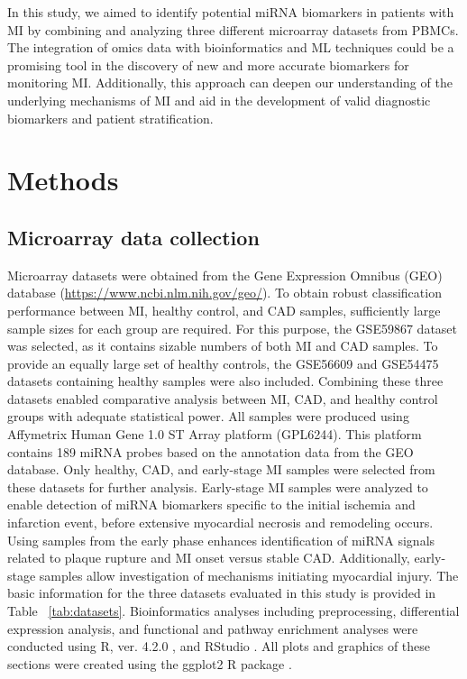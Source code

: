 \documentclass[sn-mathphys,Numbered]{sn-jnl}%
\theoremstyle{thmstyleone}%
\theoremstyle{thmstyletwo}%
\theoremstyle{thmstylethree}%
\begin{document}
In this study, we aimed to identify potential miRNA biomarkers in
patients with MI by combining and analyzing three different microarray
datasets from PBMCs. The integration of omics data with bioinformatics
and ML techniques could be a promising tool in the discovery of new and
more accurate biomarkers for monitoring MI. Additionally, this approach
can deepen our understanding of the underlying mechanisms of MI and aid
in the development of valid diagnostic biomarkers and patient
stratification.
 
\section{Methods}\label{methods}

\subsection{Microarray data
collection}\label{microarray-data-collection}

Microarray datasets were obtained from the Gene Expression Omnibus (GEO)
database (\url{https://www.ncbi.nlm.nih.gov/geo/}).
To obtain robust classification performance between MI, healthy control, and CAD samples, sufficiently large sample sizes for each group are required. For this purpose, the GSE59867 dataset was selected, as it contains sizable numbers of both MI and CAD samples. To provide an equally large set of healthy controls, the GSE56609 and GSE54475 datasets containing healthy samples were also included. Combining these three datasets enabled comparative analysis between MI, CAD, and healthy control groups with adequate statistical power.
All samples were produced using Affymetrix Human Gene 1.0 ST Array
platform (GPL6244). 
This platform contains 189 miRNA probes based on the annotation data from the GEO database.
Only healthy, CAD, and early-stage MI samples were
selected from these datasets for further analysis.
Early-stage MI samples were analyzed to enable detection of miRNA biomarkers specific to the initial ischemia and infarction event, before extensive myocardial necrosis and remodeling occurs. Using samples from the early phase enhances identification of miRNA signals related to plaque rupture and MI onset versus stable CAD. Additionally, early-stage samples allow investigation of mechanisms initiating myocardial injury.
The basic information
for the three datasets evaluated in this study is provided in Table
~\ref{tab:datasets}. Bioinformatics analyses 
including  preprocessing, differential expression analysis, and functional and pathway enrichment
analyses
were conducted using R, ver.
4.2.0 \cite{R}, and RStudio \cite{RStudio}. All plots and
graphics of these sections were created using the ggplot2 R package \cite{ggplot}.
\end{document}
